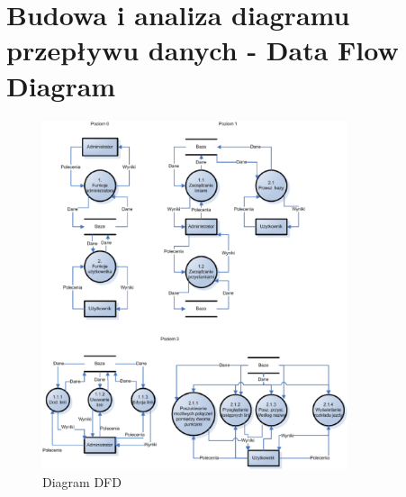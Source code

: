 \section{Budowa i analiza diagramu przepływu danych - Data Flow Diagram }
\newpage
\begin{figure}[!htp]
  \centering
  \includegraphics[width=0.8\textwidth]{./img/schema.eps}
  \caption{Diagram DFD}
  \label{fig:scr3}
\end{figure}